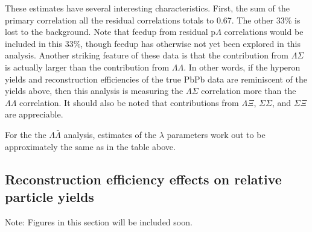 These estimates have several interesting characteristics.  First, the sum of the primary correlation all the residual correlations totals to 0.67.  The other 33\% is lost to the background.  Note that feedup from residual p$\Lambda$ correlations would be included in this 33\%, though feedup has otherwise not yet been explored in this analysis. Another striking feature of these data is that the contribution from $\Lambda\Sigma$ is actually larger than the contribution from $\Lambda\Lambda$.  In other words, if the hyperon yields and reconstruction efficiencies of the true PbPb data are reminiscent of the yields above, then this analysis is measuring the $\Lambda\Sigma$ correlation more than the $\Lambda\Lambda$ correlation.  It should also be noted that contributions from $\Lambda\Xi$, $\Sigma\Sigma$, and $\Sigma\Xi$ are appreciable.

For the the $\Lambda\bar{\Lambda}$ analysis, estimates of the $\lambda$ parameters work out to be approximately the same as in the table above.

\subsection{Reconstruction efficiency effects on relative particle yields}
\label{sec:ReconstructionEff}

Note: Figures in this section will be included soon.

